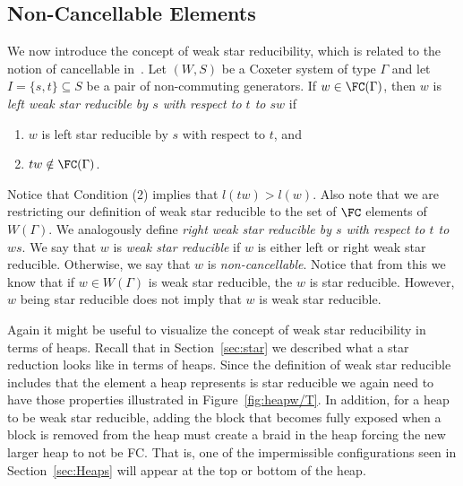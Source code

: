 

\subsection{Non-Cancellable Elements}\label{sec:noncancel}
 
We now introduce the concept of weak star reducibility, which is related to the notion of cancellable in~\cite{Fan1997}. Let $(W,S)$ be a Coxeter system of type $\Gamma$ and let $I=\{s,t\} \subseteq S$ be a pair of non-commuting generators. If $w  \in \FC(\Gamma)$, then $w$ is \emph{left weak star reducible by $s$ with respect to $t$ to $sw$} if
\begin{enumerate}[leftmargin=2cm]
\item $w$ is left star reducible by $s$ with respect to $t$, and
\item $tw \notin \FC(\Gamma)$.	
\end{enumerate}
Notice that Condition (2) implies that $l(tw)>l(w)$. Also note that we are restricting our definition of weak star reducible to the set of $\FC$ elements of $W(\Gamma)$. We analogously define \emph{right weak star reducible by $s$ with respect to $t$ to $ws$}. We say that $w$ is \emph{weak star reducible} if $w$ is either left or right weak star reducible. Otherwise, we say that $w$ is \emph{non-cancellable}. Notice that from this we know that if $w \in W(\Gamma)$ is weak star reducible, the $w$ is star reducible. However, $w$ being star reducible does not imply that $w$ is weak star reducible.


Again it might be useful to visualize the concept of weak star reducibility in terms of heaps. Recall that in Section~\ref{sec:star} we described what a star reduction looks like in terms of heaps. Since the definition of weak star reducible includes that the element a heap represents is star reducible we again need to have those properties illustrated in Figure~\ref{fig:heapw/T}. In addition, for a heap to be weak star reducible, adding the block that becomes fully exposed when a block is removed from the heap must create a braid in the heap forcing the new larger heap to not be FC. That is, one of the impermissible configurations seen in Section~\ref{sec:Heaps} will appear at the top or bottom of the heap.

